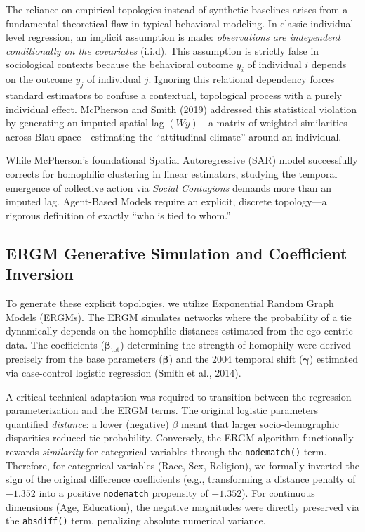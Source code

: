 \documentclass[11pt,a4paper]{article}
\begin{document}
The reliance on empirical topologies instead of synthetic baselines arises from a fundamental theoretical flaw in typical behavioral modeling. In classic individual-level regression, an implicit assumption is made: \textit{observations are independent conditionally on the covariates} (i.i.d). This assumption is strictly false in sociological contexts because the behavioral outcome $y_i$ of individual $i$ depends on the outcome $y_j$ of individual $j$. Ignoring this relational dependency forces standard estimators to confuse a contextual, topological process with a purely individual effect. McPherson and Smith (2019) addressed this statistical violation by generating an imputed spatial lag $(Wy)$---a matrix of weighted similarities across Blau space---estimating the ``attitudinal climate'' around an individual.

While McPherson's foundational Spatial Autoregressive (SAR) model successfully corrects for homophilic clustering in linear estimators, studying the temporal emergence of collective action via \textit{Social Contagions} demands more than an imputed lag. Agent-Based Models require an explicit, discrete topology---a rigorous definition of exactly ``who is tied to whom.'' 

\subsection{ERGM Generative Simulation and Coefficient Inversion}
To generate these explicit topologies, we utilize Exponential Random Graph Models (ERGMs). The ERGM simulates networks where the probability of a tie dynamically depends on the homophilic distances estimated from the ego-centric data. The coefficients ($\boldsymbol{\beta}_{\text{tot}}$) determining the strength of homophily were derived precisely from the base parameters ($\boldsymbol{\beta}$) and the 2004 temporal shift ($\boldsymbol{\gamma}$) estimated via case-control logistic regression (Smith et al., 2014).

A critical technical adaptation was required to transition between the regression parameterization and the ERGM terms. The original logistic parameters quantified \textit{distance}: a lower (negative) $\beta$ meant that larger socio-demographic disparities reduced tie probability. Conversely, the ERGM algorithm functionally rewards \textit{similarity} for categorical variables through the \texttt{nodematch()} term. Therefore, for categorical variables (Race, Sex, Religion), we formally inverted the sign of the original difference coefficients (e.g., transforming a distance penalty of $-1.352$ into a positive \texttt{nodematch} propensity of $+1.352$). For continuous dimensions (Age, Education), the negative magnitudes were directly preserved via the \texttt{absdiff()} term, penalizing absolute numerical variance.
\end{document}
